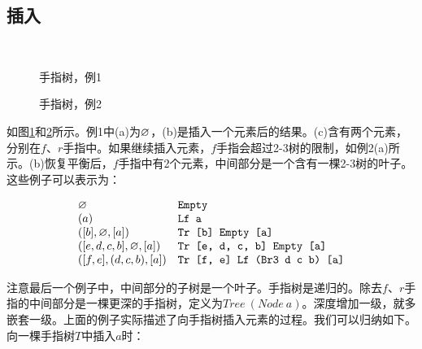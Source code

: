 \documentclass[b5paper]{ctexart}
\begin{document}
\subsection{插入}

\begin{figure}[htbp]
  \centering
   \\
  \caption{手指树，例1}
  \label{fig:ftr-example-1}
\end{figure}

\begin{figure}[htbp]
  \centering
  \hspace{0.2\textwidth}
  \caption{手指树，例2}
\label{fig:ftr-example-2}
\end{figure}

如图\ref{fig:ftr-example-1}和\ref{fig:ftr-example-2}所示。例1中(a)为$\varnothing$，(b)是插入一个元素后的结果。(c)含有两个元素，分别在$f$、$r$手指中。如果继续插入元素，$f$手指会超过2-3树的限制，如例2(a)所示。(b)恢复平衡后，$f$手指中有2个元素，中间部分是一个含有一棵2-3树的叶子。这些例子可以表示为：

\[
\begin{array}{ll}
\varnothing & \texttt{Empty}\\
(a) & \texttt{Lf a}\\
([b], \varnothing, [a]) & \texttt{Tr [b] Empty [a]}\\
([e, d, c, b], \varnothing, [a]) & \texttt{Tr [e, d, c, b] Empty [a]}\\
([f, e], (d, c, b), [a]) & \texttt{Tr [f, e] Lf (Br3 d c b) [a]}\\
\end{array}
\]

注意最后一个例子中，中间部分的子树是一个叶子。手指树是递归的。除去$f$、$r$手指的中间部分是一棵更深的手指树，定义为$Tree\ (Node\ a)$。深度增加一级，就多嵌套一级。上面的例子实际描述了向手指树插入元素的过程。我们可以归纳如下。向一棵手指树$T$中插入$a$时：
\end{document}
